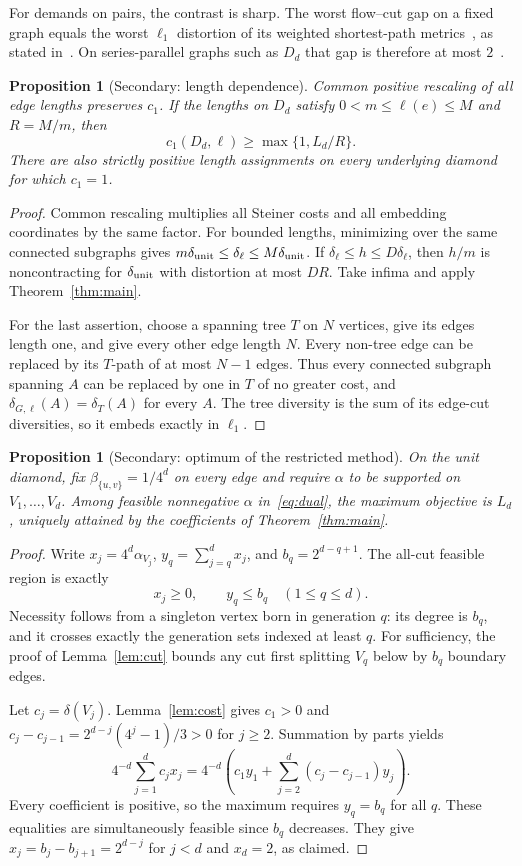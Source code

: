\documentclass[11pt]{article}
\newtheorem{proposition}[theorem]{Proposition}
\begin{document}
For demands on pairs, the contrast is sharp. The worst flow--cut gap on a
fixed graph equals the worst $\ell_1$ distortion of its weighted
shortest-path metrics~\cite[Section~3, Theorem~3.2]{GNRS}, as stated
in~\cite[Section~1.1]{OAIplanar}. On series-parallel graphs such as $D_d$
that gap is therefore at most $2$~\cite{CJLV}.

\begin{proposition}[Secondary: length dependence]\label{prop:length}
Common positive rescaling of all edge lengths preserves $c_1$. If the
lengths on $D_d$ satisfy $0<m\le\ell(e)\le M$ and $R=M/m$, then
\[
c_1(D_d,\ell)\ge\max\{1,L_d/R\}.
\]
There are also strictly positive length assignments on every underlying
diamond for which $c_1=1$.
\end{proposition}
\begin{proof}
Common rescaling multiplies all Steiner costs and all embedding coordinates
by the same factor. For bounded lengths, minimizing over the same connected
subgraphs gives $m\delta_{\rm unit}\le\delta_\ell\le M\delta_{\rm unit}$.
If $\delta_\ell\le h\le D\delta_\ell$, then $h/m$ is noncontracting for
$\delta_{\rm unit}$ with distortion at most $DR$. Take infima and apply
Theorem~\ref{thm:main}.

For the last assertion, choose a spanning tree $T$ on $N$ vertices, give
its edges length one, and give every other edge length $N$. Every non-tree
edge can be replaced by its $T$-path of at most $N-1$ edges. Thus every
connected subgraph spanning $A$ can be replaced by one in $T$ of no greater
cost, and $\delta_{G,\ell}(A)=\delta_T(A)$ for every $A$. The tree diversity
is the sum of its edge-cut diversities, so it embeds exactly in $\ell_1$.
\end{proof}

\begin{proposition}[Secondary: optimum of the restricted method]\label{prop:method}
On the unit diamond, fix $\beta_{\{u,v\}}=1/4^d$ on every edge and require
$\alpha$ to be supported on $V_1,\ldots,V_d$. Among feasible nonnegative
$\alpha$ in~\eqref{eq:dual}, the maximum objective is $L_d$, uniquely attained
by the coefficients of Theorem~\ref{thm:main}.
\end{proposition}
\begin{proof}
Write $x_j=4^d\alpha_{V_j}$, $y_q=\sum_{j=q}^dx_j$, and
$b_q=2^{d-q+1}$. The all-cut feasible region is exactly
\[
x_j\ge0,\qquad y_q\le b_q\quad(1\le q\le d).
\]
Necessity follows from a singleton vertex born in generation $q$: its degree
is $b_q$, and it crosses exactly the generation sets indexed at least $q$.
For sufficiency, the proof of Lemma~\ref{lem:cut} bounds any cut first
splitting $V_q$ below by $b_q$ boundary edges.

Let $c_j=\delta(V_j)$. Lemma~\ref{lem:cost} gives $c_1>0$ and
$c_j-c_{j-1}=2^{d-j}(4^j-1)/3>0$ for $j\ge2$. Summation by parts yields
\[
4^{-d}\sum_{j=1}^dc_jx_j
=4^{-d}\left(c_1y_1+\sum_{j=2}^d(c_j-c_{j-1})y_j\right).
\]
Every coefficient is positive, so the maximum requires $y_q=b_q$ for all
$q$. These equalities are simultaneously feasible since $b_q$ decreases.
They give $x_j=b_j-b_{j+1}=2^{d-j}$ for $j<d$ and $x_d=2$, as claimed.
\end{proof}
\end{document}
